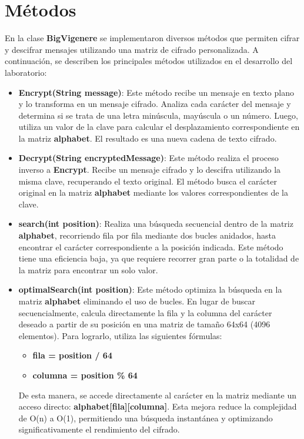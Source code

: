 \documentclass[12pt]{article}
\begin{document}
\section{Métodos}

En la clase \textbf{BigVigenere} se implementaron diversos métodos que permiten cifrar y descifrar mensajes utilizando una matriz de cifrado personalizada. A continuación, se describen los principales métodos utilizados en el desarrollo del laboratorio:

\begin{itemize}
    \item \textbf{Encrypt(String message)}: Este método recibe un mensaje en texto plano y lo transforma en un mensaje cifrado. Analiza cada carácter del mensaje y determina si se trata de una letra minúscula, mayúscula o un número. Luego, utiliza un valor de la clave para calcular el desplazamiento correspondiente en la matriz \textbf{alphabet}. El resultado es una nueva cadena de texto cifrado.

    \item \textbf{Decrypt(String encryptedMessage)}: Este método realiza el proceso inverso a \textbf{Encrypt}. Recibe un mensaje cifrado y lo descifra utilizando la misma clave, recuperando el texto original. El método busca el carácter original en la matriz \textbf{alphabet} mediante los valores correspondientes de la clave.

    \item \textbf{search(int position)}: Realiza una búsqueda secuencial dentro de la matriz \textbf{alphabet}, recorriendo fila por fila mediante dos bucles anidados, hasta encontrar el carácter correspondiente a la posición indicada. Este método tiene una eficiencia baja, ya que requiere recorrer gran parte o la totalidad de la matriz para encontrar un solo valor.

    \item \textbf{optimalSearch(int position)}: Este método optimiza la búsqueda en la matriz \textbf{alphabet} eliminando el uso de bucles. En lugar de buscar secuencialmente, calcula directamente la fila y la columna del carácter deseado a partir de su posición en una matriz de tamaño 64x64 (4096 elementos). Para lograrlo, utiliza las siguientes fórmulas:
    \begin{itemize}
        \item \textbf{fila = position / 64}
        \item \textbf{columna = position \% 64}
    \end{itemize}
    De esta manera, se accede directamente al carácter en la matriz mediante un acceso directo: \textbf{alphabet[fila][columna]}. Esta mejora reduce la complejidad de O(n) a O(1), permitiendo una búsqueda instantánea y optimizando significativamente el rendimiento del cifrado.


\end{itemize}
\end{document}
